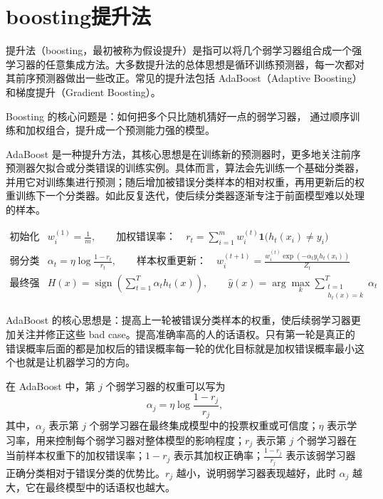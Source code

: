 \section{boosting提升法}
\begin{definition}
提升法（boosting，最初被称为假设提升）是指可以将几个弱学习器组合成一个强学习器的任意集成方法。大多数提升法的总体思想是循环训练预测器，每一次都对其前序预测器做出一些改正。常见的提升法包括 AdaBoost（Adaptive Boosting）和梯度提升（Gradient Boosting）。
\end{definition}
\begin{dxtips}
    Boosting 的核心问题是：如何把多个只比随机猜好一点的弱学习器，
    通过顺序训练和加权组合，提升成一个预测能力强的模型。
\end{dxtips}
\begin{definition}[AdaBoost]
AdaBoost 是一种提升方法，其核心思想是在训练新的预测器时，更多地关注前序预测器欠拟合或分类错误的训练实例。具体而言，算法会先训练一个基础分类器，并用它对训练集进行预测；随后增加被错误分类样本的相对权重，再用更新后的权重训练下一个分类器。如此反复迭代，使后续分类器逐渐专注于前面模型难以处理的样本。
\end{definition}
\begin{align}
\text{初始化样本权重：}\quad 
&w_i^{(1)}=\frac{1}{m},
\qquad
\text{加权错误率：}\quad
r_t=\sum_{i=1}^{m} w_i^{(t)}\mathbf{1}\bigl(h_t(x_i)\neq y_i\bigr)
\\[4pt]
\text{弱分类器权重：}\quad
&\alpha_t=\eta\log\frac{1-r_t}{r_t},
\qquad
\text{样本权重更新：}\quad
w_i^{(t+1)}
=
\frac{
w_i^{(t)}\exp\left(-\alpha_t y_i h_t(x_i)\right)
}{
Z_t
}
\\[4pt]
\text{最终强分类器：}\quad
&H(x)=\operatorname{sign}\left(\sum_{t=1}^{T}\alpha_t h_t(x)\right),
\qquad
\hat{y}(x)
=
\arg\max_{k}
\sum_{\substack{t=1\\ h_t(x)=k}}^{T}
\alpha_t
\end{align}
\begin{dxtips}
    AdaBoost 的核心思想是：提高上一轮被错误分类样本的权重，使后续弱学习器更加关注并修正这些 bad case。提高准确率高的人的话语权。只有第一轮是真正的错误概率后面的都是加权后的错误概率每一轮的优化目标就是加权错误概率最小这个也就是让机器学习的方向。
\end{dxtips}
\begin{note}
在 AdaBoost 中，第 $j$ 个弱学习器的权重可以写为
\[
\alpha_j = \eta \log \frac{1-r_j}{r_j},
\]
其中，$\alpha_j$ 表示第 $j$ 个弱学习器在最终集成模型中的投票权重或可信度；$\eta$ 表示学习率，用来控制每个弱学习器对整体模型的影响程度；$r_j$ 表示第 $j$ 个弱学习器在当前样本权重下的加权错误率；$1-r_j$ 表示其加权正确率；$\frac{1-r_j}{r_j}$ 表示该弱学习器正确分类相对于错误分类的优势比。$r_j$ 越小，说明弱学习器表现越好，此时 $\alpha_j$ 越大，它在最终模型中的话语权也越大。
\end{note}
